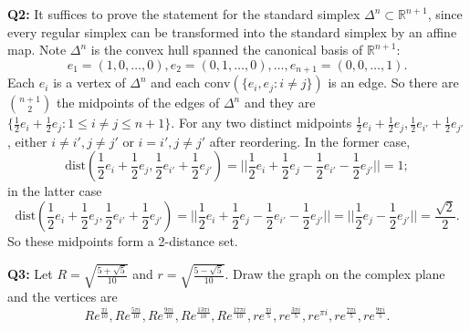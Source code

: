 \documentclass[12pt,reqno]{amsart}
\theoremstyle{definition}
\newcommand{\RR}{\mathbb{R}}
\newcommand{\conv}[1]{\mathrm{conv}(#1)}
\begin{document}
\begin{center}
\end{center}


\newpage
\noindent \textbf{Q2:} It suffices to prove the statement for the standard simplex $\Delta^n\subset \RR^{n+1}$, since every regular simplex can be transformed into the standard simplex by an affine map. Note $\Delta^n$ is the convex hull spanned the canonical basis of $\RR^{n+1}$:$$e_1=(1,0,\dots,0), e_2=(0,1,\dots,0),\dots, e_{n+1} = (0,0,\dots,1).$$ Each $e_i$ is a vertex of $\Delta^n$ and each $\conv{\{e_i,e_j:i\not=j\}}$ is an edge. So there are $\binom{n+1}{2}$ the midpoints of the edges of $\Delta^n$ and they are $\{\frac{1}{2}e_i+\frac{1}{2}e_j:  1\leq i\not=j \leq n+1\}$. For any two distinct midpoints $\frac{1}{2}e_i+\frac{1}{2}e_j, \frac{1}{2}e_{i'}+\frac{1}{2}e_{j'}$, either $i\not=i',j\not=j'$ or $i=i', j\not=j'$ after reordering. In the former case,  $$\mathrm{dist}( \frac{1}{2}e_i+\frac{1}{2}e_j, \frac{1}{2}e_{i'}+\frac{1}{2}e_{j'} ) = ||\frac{1}{2}e_i+\frac{1}{2}e_j - \frac{1}{2}e_{i'}-\frac{1}{2}e_{j'}||= 1;$$
in the latter case $$\mathrm{dist}( \frac{1}{2}e_i+\frac{1}{2}e_j, \frac{1}{2}e_{i'}+\frac{1}{2}e_{j'} ) = ||\frac{1}{2}e_i+\frac{1}{2}e_j - \frac{1}{2}e_{i'}-\frac{1}{2}e_{j'}|| =||\frac{1}{2}e_j -\frac{1}{2}e_{j'}||  = \frac{\sqrt{2}}{2}.$$
So these midpoints form a 2-distance set.



\newpage
\noindent \textbf{Q3:} Let $R=\sqrt{\frac{5+\sqrt{5}}{10}}$ and $r=\sqrt{\frac{5-\sqrt{5}}{10}}$. Draw the graph on the complex plane and the vertices are $$Re^{\frac{\pi i}{10}},Re^{\frac{5\pi i}{10}},Re^{\frac{9\pi i}{10}},Re^{\frac{13 \pi i}{10}},Re^{\frac{17\pi i}{10}}, re^{\frac{\pi i}{5}}, re^{\frac{3\pi i}{5}},  re^{\pi i},  re^{\frac{7\pi i}{5}}, re^{\frac{9\pi i}{5}}.$$
\begin{center}
\end{center}
\end{document}
